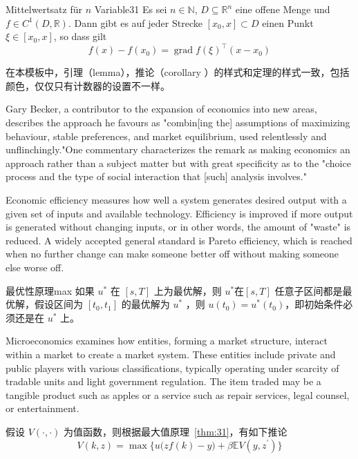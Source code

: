 \documentclass[titlestyle=hang,11pt]{elegantbook}
\begin{document}
\begin{theorem}{Mittelwertsatz f\"{u}r $n$ Variable}{31}
Es sei $n\in\mathbb{N}$, $D\subseteq\mathbb{R}^n$ eine offene Menge und $f\in C^{1}(D,\mathbb{R})$. Dann gibt es auf jeder Strecke $[x_0,x]\subset D$ einen Punkt $\xi\in[x_0,x]$, so dass gilt
\begin{equation*}
   f(x)-f(x_0) = \operatorname{grad} f(\xi)^{\top}(x-x_0)
\end{equation*}
\end{theorem}

\begin{note}
在本模板中，引理（lemma），推论（corollary ）的样式和定理的样式一致，包括颜色，仅仅只有计数器的设置不一样。
\end{note}


Gary Becker, a contributor to the expansion of economics into new areas, describes the approach he favours as "combin[ing the] assumptions of maximizing behaviour, stable preferences, and market equilibrium, used relentlessly and unflinchingly."One commentary characterizes the remark as making economics an approach rather than a subject matter but with great specificity as to the "choice process and the type of social interaction that [such] analysis involves." 


Economic efficiency measures how well a system generates desired output with a given set of inputs and available technology. Efficiency is improved if more output is generated without changing inputs, or in other words, the amount of "waste" is reduced. A widely accepted general standard is Pareto efficiency, which is reached when no further change can make someone better off without making someone else worse off.

\begin{proposition}{最优性原理}{max}
如果 $u^*$ 在 $[s,T]$ 上为最优解，则 $u^*$在$[s,T]$ 任意子区间都是最优解，假设区间为 $[t_0,t_1]$ 的最优解为 $u^*$ ，则 $u(t_0)=u^{*}(t_0)$，即初始条件必须还是在 $u^*$ 上。
\end{proposition}

Microeconomics examines how entities, forming a market structure, interact within a market to create a market system. These entities include private and public players with various classifications, typically operating under scarcity of tradable units and light government regulation. The item traded may be a tangible product such as apples or a service such as repair services, legal counsel, or entertainment.

\begin{corollary}{}{}
假设 $V(\cdot,\cdot)$ 为值函数，则根据最大值原理~\ref{thm:31}，有如下推论
\[
V(k,z)=\max\Big\{u\big(zf(k)-y\big)+\beta \mathbb{E}V(y,z^\prime)\Big\}
\]
\end{corollary}
\end{document}
